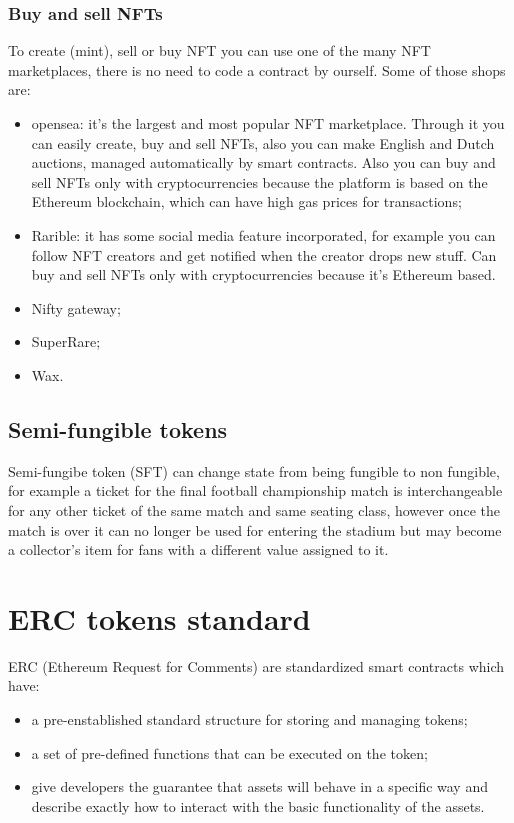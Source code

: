 \subsubsection{Buy and sell NFTs}
To create (mint), sell or buy NFT you can use one of the many NFT marketplaces, there is no need to code a contract by ourself.
Some of those shops are:
\begin{itemize}
    \item opensea: it's the largest and most popular NFT marketplace.
    Through it you can easily create, buy and sell NFTs, also you can make English and Dutch auctions, managed automatically by smart contracts.
    Also you can buy and sell NFTs only with cryptocurrencies because the platform is based on the Ethereum blockchain, which can have high gas prices for transactions;

    \item Rarible: it has some social media feature incorporated, for example you can follow NFT creators and get notified when the creator drops new stuff.
    Can buy and sell NFTs only with cryptocurrencies because it's Ethereum based.

    \item Nifty gateway;
    \item SuperRare;
    \item Wax.
\end{itemize}

\subsection{Semi-fungible tokens}
Semi-fungibe token (SFT) can change state from being fungible to non fungible, for example a ticket for the final football championship match is interchangeable for any other ticket of the same match and same seating class, however once the match is over it can no longer be used for entering the stadium but may become a collector's item for fans with a different value assigned to it.

\section{ERC tokens standard}
ERC (Ethereum Request for Comments) are standardized smart contracts which have:
\begin{itemize}
    \item a pre-enstablished standard structure for storing and managing tokens;
    \item a set of pre-defined functions that can be executed on the token;
    \item give developers the guarantee that assets will behave in a specific way and describe exactly how to interact with the basic functionality of the assets.
\end{itemize}

